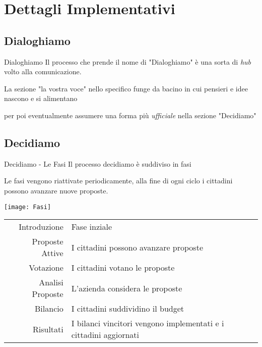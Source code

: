 \section{Dettagli Implementativi}

\subsection{Dialoghiamo}
\begin{frame}{Dialoghiamo}
  Il processo che prende il nome di "Dialoghiamo" è una sorta di \emph{hub} volto alla comunicazione.

  La sezione "la vostra voce" nello specifico funge da bacino in cui pensieri e idee nascono e si alimentano

  per poi eventualmente assumere una forma più \emph{ufficiale} nella sezione "Decidiamo"
\end{frame}
\subsection{Decidiamo}
\begin{frame}{Decidiamo - Le Fasi}
  Il processo decidiamo è suddiviso in fasi

  \pause
  Le fasi vengono riattivate periodicamente, alla fine di ogni ciclo i cittadini possono avanzare nuove proposte.


  \begin{center}
    \texttt{[image: Fasi]}
  \end{center}
\end{frame}
\begin{frame}

  \begin{table}
    \renewcommand\arraystretch{1.4}

    \begin{tabular}{@{\,}r <{\hskip 2pt} !{\foo} >{\raggedright\arraybackslash}p{5cm}}

      \addlinespace[1.5ex]
      Introduzione     & \small{Fase inziale}                                                      \\
      Proposte Attive  & \small{I cittadini possono avanzare proposte}                             \\
      Votazione        & \small{I cittadini votano le proposte  }                                  \\
      Analisi Proposte & \small{L'azienda considera le proposte}                                   \\
      Bilancio         & \small{I cittadini suddividino il budget}                                 \\
      Risultati        & \small{I bilanci vincitori vengono implementati e i cittadini aggiornati} \\
    \end{tabular}
  \end{table}
\end{frame}

